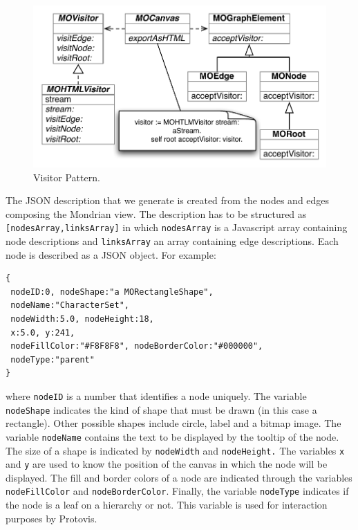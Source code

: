 \documentclass[preprint,10pt]{sigplanconf}
\newcommand{\ct}{\lstinline[backgroundcolor=\color{white},basicstyle=\footnotesize\ttfamily]}
\newcommand{\ab}[1]{\nb{Alexandre}{blue}{#1}}
\newcommand{\sv}[1]{\nb{Santiago}{orange}{#1}}
\begin{document}
\begin{figure}
\begin{centering}
\includegraphics[bb=0bp 0bp 413bp 228bp,scale=0.60]{VisitorPattern} 
\par\end{centering}

\caption{Visitor Pattern.\label{fig:VisitorPattern}}

\end{figure}
The JSON description that we generate is created from the nodes and edges composing the Mondrian view. 
The description has to be structured as \ct{[nodesArray,linksArray]} in which \ct{nodesArray} is a Javascript array containing node descriptions and \ct{linksArray} an array containing edge descriptions.
Each node is described as a JSON object. For example:

\begin{lstlisting} 
{
 nodeID:0, nodeShape:"a MORectangleShape", 
 nodeName:"CharacterSet", 
 nodeWidth:5.0, nodeHeight:18, 
 x:5.0, y:241, 
 nodeFillColor:"#F8F8F8", nodeBorderColor:"#000000", 
 nodeType:"parent"
}
\end{lstlisting}

where \ct{nodeID} is a number that identifies a node uniquely. The variable \ct{nodeShape} indicates the kind of shape that must be drawn (in this case a rectangle). Other possible shapes include circle, label and a bitmap image.
The variable \ct{nodeName} contains the text to be displayed by the tooltip of the node. The size of a shape is indicated by \ct{nodeWidth} and \ct{nodeHeight.} The variables \ct{x} and \ct{y} are used to know the position of the canvas in which the node will be displayed. The fill and border colors of a node are indicated through the variables \ct{nodeFillColor} and \ct{nodeBorderColor}. Finally, the variable \ct{nodeType} indicates if the node is a leaf on a hierarchy or not. This variable is used for interaction purposes by Protovis.%
\end{document}
